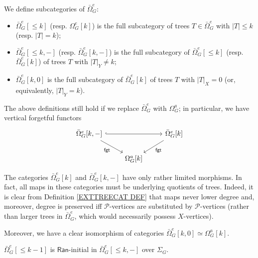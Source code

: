 \documentclass[a4paper,10pt]{article}%
\begin{document}
\begin{definition}\label{TREE_FILTRATION_PIECES_DEFINITION}
We define subcategories of $\bar{\Omega}_{G}^e$:
  \begin{itemize}
  \item $\bar{\Omega}_G^e[\leq k]$ (resp. $\Omega_G^e[k]$) is the full subcategory of trees 
  $T \in \bar{\Omega}_G^e$ with $|T|\leq k$ (resp. $|T| = k$);
  \item $\bar{\Omega}_G^e[\leq k,-]$ (resp. $\bar{\Omega}_G^e[k,-]$) is the full subcategory of $\bar{\Omega}_G^e[\leq k]$ (resp. $\bar{\Omega}_G^e[k]$) of trees $T$ with $|T|_{Y}\neq k$;
  \item $\bar{\Omega}_G^e[k,0]$ is the full subcategory of 
  $\bar{\Omega}_G^e[k]$ of trees $T$ with $|T|_X = 0$ (or, equivalently, $|T|_{Y} = k$).
  \end{itemize}
The above definitions still hold if we replace $\bar\Omega_G^e$ with $\Omega_G^a$; in particular, we have vertical forgetful functors
\[
\begin{tikzcd}
  \bar\Omega_G^e[k,-] \arrow[dr, "\mathsf{fgt}"'] \arrow[rr, hookrightarrow] && \bar\Omega_G^e[k] \arrow[dl, "\mathsf{fgt}"]\\
  & \Omega_G^a[k]
\end{tikzcd}
\]
\end{definition}


\begin{remark}\label{LIMMOR REM}
  The categories $\bar{\Omega}_G^e[k]$ and $\bar{\Omega}_G^e[k,-]$ have only rather limited morphisms.
  In fact, all maps in these categories must be underlying quotients of trees. Indeed, it is clear from Definition \ref{EXTTREECAT DEF} that maps never lower degree and, moreover, degree is preserved iff $\mathcal{P}$-vertices are substituted by $\mathcal{P}$-vertices (rather than larger trees in $\bar{\Omega}_G^e$, which would necessarily possess $X$-vertices).
  
  Moreover, we have a clear isomorphism of categories $\bar\Omega_G^e[k,0] \simeq \Omega_G^a[k]$. 
\end{remark}


\begin{lemma}\label{MINUS_LAN_FINAL_LEMMA}
  $\bar{\Omega}_G^e[\leq k-1]$ is $\mathsf{Ran}$-initial in $\bar{\Omega}_G^{e}[\leq k,-]$ over $\Sigma_G$.
\end{lemma}
\end{document}
